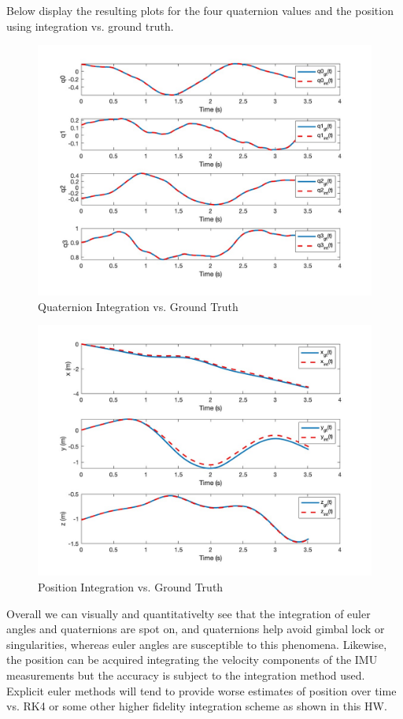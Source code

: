 \documentclass{article}
\begin{document}
Below display the resulting plots for the four quaternion values and the position using integration vs. ground truth.

\begin{figure}[H]
    \centering
    \includegraphics[width=0.8\linewidth]{partb_quaternions.jpg}
    \caption{Quaternion Integration vs. Ground Truth}
\end{figure}

\begin{figure}[H]
    \centering
    \includegraphics[width=0.8\linewidth]{partb_position.jpg}
    \caption{Position Integration vs. Ground Truth}
\end{figure}

Overall we can visually and quantitativelty see that the integration of euler angles and quaternions are spot on, and quaternions help avoid gimbal lock or singularities, whereas euler angles are susceptible to this phenomena. Likewise, the position can be acquired integrating the velocity components of the IMU measurements but the accuracy is subject to the integration method used. Explicit euler methods will tend to provide worse estimates of position over time vs. RK4 or some other higher fidelity integration scheme as shown in this HW.
\end{document}
